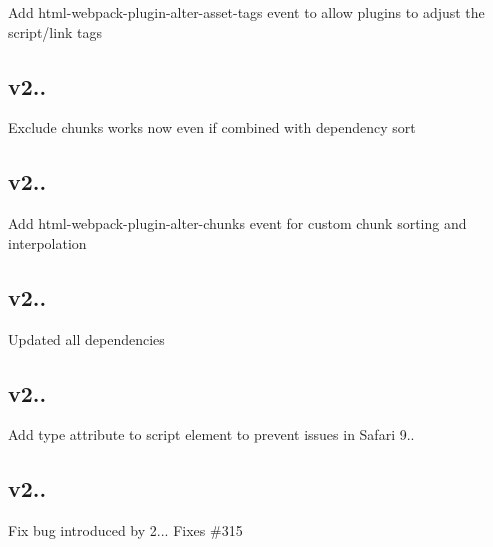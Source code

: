 \begin{DoxyItemize}
\item Add {\ttfamily html-\/webpack-\/plugin-\/alter-\/asset-\/tags} event to allow plugins to adjust the script/link tags
\end{DoxyItemize}

\subsection*{v2.. }


\begin{DoxyItemize}
\item Exclude chunks works now even if combined with dependency sort
\end{DoxyItemize}

\subsection*{v2.. }


\begin{DoxyItemize}
\item Add {\ttfamily html-\/webpack-\/plugin-\/alter-\/chunks} event for custom chunk sorting and interpolation
\end{DoxyItemize}

\subsection*{v2.. }


\begin{DoxyItemize}
\item Updated all dependencies
\end{DoxyItemize}

\subsection*{v2.. }


\begin{DoxyItemize}
\item Add {\ttfamily type} attribute to {\ttfamily script} element to prevent issues in Safari 9..
\end{DoxyItemize}

\subsection*{v2.. }


\begin{DoxyItemize}
\item Fix bug introduced by 2... Fixes \#315
\end{DoxyItemize}

